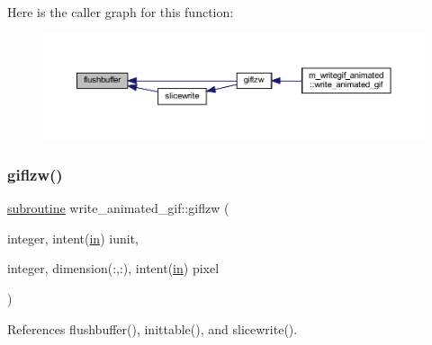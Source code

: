 Here is the caller graph for this function\+:
\nopagebreak
\begin{figure}[H]
\begin{center}
\leavevmode
\includegraphics[width=350pt]{M__writegif__animated_8f90_a83cb0569b0e010d8ad27afd1b4cd945e_icgraph}
\end{center}
\end{figure}
\mbox{\label{M__writegif__animated_8f90_aa30b256c6cb90f13a18e32768d35696b}} 
\subsubsection{\texorpdfstring{giflzw()}{giflzw()}}
{\footnotesize\ttfamily \hyperlink{M__stopwatch_83_8txt_acfbcff50169d691ff02d4a123ed70482}{subroutine} write\+\_\+animated\+\_\+gif\+::giflzw (\begin{DoxyParamCaption}\item[{integer, intent(\hyperlink{M__journal_83_8txt_afce72651d1eed785a2132bee863b2f38}{in})}]{iunit,  }\item[{integer, dimension(\+:,\+:), intent(\hyperlink{M__journal_83_8txt_afce72651d1eed785a2132bee863b2f38}{in})}]{pixel }\end{DoxyParamCaption})\hspace{0.3cm}{\ttfamily [private]}}



References flushbuffer(), inittable(), and slicewrite().

